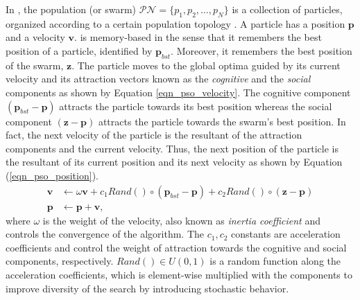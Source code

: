 In \pso, the population (or swarm) $\mathcal{PN}=\{p_1,p_2,…,p_N\}$ is a collection of particles, organized according to a certain population topology \cite{Liu2016TopologyOptimization}. A particle has a position $\textbf{p}$ and a velocity $\textbf{v}$. \pso{} is memory-based in the sense that it remembers the best position of a particle, identified by $\textbf{p}_{bst}$. Moreover, it remembers the best position of the swarm, $\textbf{z}$. The particle moves to the global optima guided by its current velocity and its attraction vectors known as the \textit{cognitive} and the \textit{social} components as shown by Equation \ref{eqn_pso_velocity}. The cognitive component $(\textbf{p}_{bst}-\textbf{p})$ attracts the particle towards its best position whereas the social component $(\textbf{z}-\textbf{p})$ attracts the particle towards the swarm's best position. In fact, the next velocity of the particle is the resultant of the attraction components and the current velocity. Thus, the next position of the particle is the resultant of its current position and its next velocity as shown by Equation (\ref{eqn_pso_position}).
\begin{align}
\label{eqn_pso_velocity}
\textbf{v} &\leftarrow  \omega\textbf{v} + c_1Rand()\circ(\textbf{p}_{bst}-\textbf{p}) + c_2Rand()\circ(\textbf{z}-\textbf{p})\\
\label{eqn_pso_position}
\textbf{p} &\leftarrow \textbf{p} + \textbf{v},
\end{align}
where $\omega$ is the weight of the velocity, also known as \textit{inertia coefficient} and controls the convergence of the algorithm. The $c_1, c_2$ constants are acceleration coefficients and control the weight of attraction towards the cognitive and social components, respectively. $Rand()\in U(0,1)$ is a random function along the acceleration coefficients, which is element-wise multiplied with the components to improve diversity of the search by introducing stochastic behavior.

